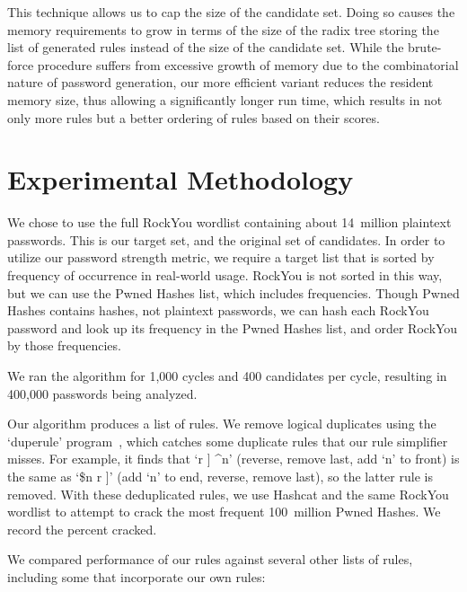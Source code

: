 \documentclass[letterpaper,twocolumn,10pt]{article}
\begin{document}
This technique allows us to cap the size of the candidate set. Doing so causes
the memory requirements to grow in terms of the size of the radix tree storing
the list of generated rules instead of the size of the candidate set. While the
brute-force procedure suffers from excessive growth of memory due to the
combinatorial nature of password generation, our more efficient variant reduces
the resident memory size, thus allowing a significantly longer run time, which
results in not only more rules but a better ordering of rules based on their
scores.

\section{Experimental Methodology}
\label{sec:methodology}

We chose to use the full RockYou wordlist containing about 14~million plaintext
passwords. This is our target set, and the original set of candidates. In order
to utilize our password strength metric, we require a target list that is
sorted by frequency of occurrence in real-world usage. RockYou is not sorted in
this way, but we can use the Pwned Hashes list\cite{pwned}, which includes
frequencies.
Though Pwned Hashes contains hashes, not plaintext passwords, we can hash each
RockYou password and look up its frequency in the Pwned Hashes list, and order
RockYou by those frequencies.

We ran the algorithm for 1,000 cycles and 400 candidates per cycle, resulting
in 400,000 passwords being analyzed.

Our algorithm produces a list of rules. We remove logical duplicates using the
`duperule' program~\cite{duprule}, which catches some duplicate rules that our
rule simplifier misses. For example, it finds that `r ] \^{}n' (reverse, remove
last, add `n' to front) is the same as `\$n r ]' (add `n' to end, reverse,
remove last), so the latter rule is removed. With these deduplicated rules, we
use Hashcat and the same RockYou wordlist to attempt to crack the most frequent
100~million Pwned Hashes. We record the percent cracked.

We compared performance of our rules against several other lists of rules,
including some that incorporate our own rules:
\end{document}
